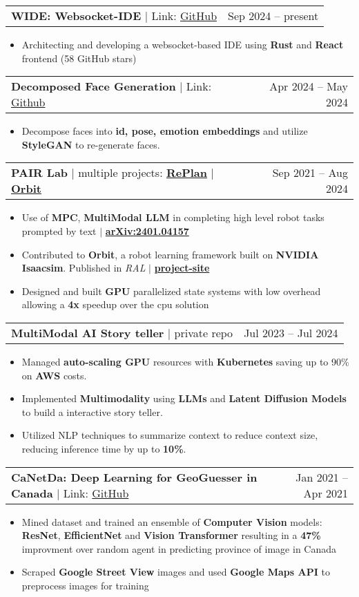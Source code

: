 \documentclass[letterpaper,11pt]{article}
\makeatletter
\newcommand{\resumeItem}[1]{
  \item\small{
    {#1 \vspace{-2pt}}
  }
}
\newcommand{\resumeProjectHeading}[2]{
    \item
    \begin{tabular*}{0.97\textwidth}{l@{\extracolsep{\fill}}r}
      \small#1 & #2 \\
    \end{tabular*}\vspace{-6pt}
}
\newcommand{\resumeItemListStart}{\begin{itemize}}
\newcommand{\resumeItemListEnd}{\end{itemize}\vspace{-7pt}}
\makeatother
\begin{document}
      \resumeProjectHeading
          {\textbf{WIDE: Websocket-IDE} $|$ Link: \href{https://github.com/JaLnYn/websocket-ide}{GitHub}}{Sep 2024 -- present}
          \resumeItemListStart
            \resumeItem{Architecting and developing a websocket-based IDE using \textbf{Rust} and \textbf{React} frontend (58 GitHub stars)}
          \resumeItemListEnd

      \resumeProjectHeading
          {\textbf{Decomposed Face Generation}  $|$ Link: \href{https://github.com/JaLnYn/talkinghead}{Github}}{Apr 2024 -- May 2024}
          \resumeItemListStart
            \resumeItem{Decompose faces into \textbf{id, pose, emotion embeddings} and utilize \textbf{StyleGAN} to re-generate faces.}
          \resumeItemListEnd

      \resumeProjectHeading
        {\textbf{PAIR Lab} | multiple projects: \href{https://arxiv.org/abs/2401.04157}{\textbf{RePlan}}  $|$ \href{https://isaac-orbit.github.io/}{\textbf{Orbit}}}{Sep 2021 -- Aug 2024}
        \resumeItemListStart
          \resumeItem{Use of \textbf{MPC}, \textbf{MultiModal LLM} in completing high level robot tasks prompted by text $|$ \href{https://arxiv.org/abs/2401.04157}{\textbf{arXiv:2401.04157}}}
          \resumeItem{Contributed to \textbf{Orbit}, a robot learning framework built on \textbf{NVIDIA Isaacsim}. Published in \textit{RAL} $|$ \href{https://isaac-orbit.github.io/}{\textbf{project-site}}}
          \resumeItem{Designed and built \textbf{GPU} parallelized state systems with low overhead allowing a \textbf{4x} speedup over the cpu solution}
        \resumeItemListEnd
      \resumeProjectHeading
          {\textbf{MultiModal AI Story teller}  $|$ private repo}{Jul 2023 -- Jul 2024}
          \resumeItemListStart
            \resumeItem{Managed \textbf{auto-scaling GPU} resources with \textbf{Kubernetes} saving up to 90\% on \textbf{AWS} costs.}
            \resumeItem{Implemented \textbf{Multimodality} using \textbf{LLMs} and \textbf{Latent Diffusion Models} to build a interactive story teller.}
            \resumeItem{Utilized NLP techniques to summarize context to reduce context size, reducing inference time by up to \textbf{10\%}.}
          \resumeItemListEnd

      \resumeProjectHeading
          {\textbf{CaNetDa: Deep Learning for GeoGuesser in Canada} $|$ Link: \href{https://github.com/st-tran/CSC413-Project}{GitHub}}{Jan 2021 -- Apr 2021}
          \resumeItemListStart
            \resumeItem{Mined dataset and trained an ensemble of \textbf{Computer Vision} models: \textbf{ResNet}, \textbf{EfficientNet} and \textbf{Vision Transformer} resulting in a \textbf{47\%} improvment over random agent in predicting province of image in Canada}
            \resumeItem{Scraped \textbf{Google Street View} images and used \textbf{Google Maps API} to preprocess images for training}
          \resumeItemListEnd
\end{document}
